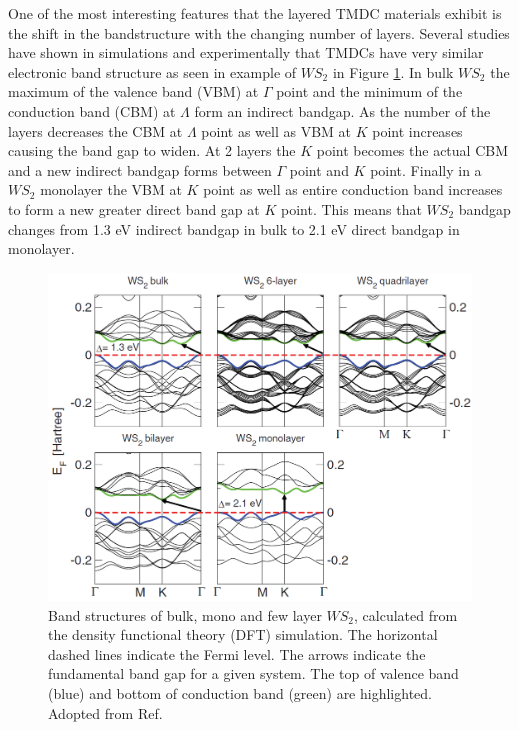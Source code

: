 One of the most interesting features that the layered TMDC materials exhibit is the shift in the bandstructure with the changing number of layers. Several studies have shown in simulations and experimentally that TMDCs have very similar electronic band structure as seen in example of $WS_2$ in Figure \ref{fig:WS2BandStructureSimulation}. In bulk $WS_2$ the maximum of the valence band (VBM) at $\Gamma$ point and the minimum of the conduction band (CBM) at $\Lambda$ form an indirect bandgap. As the number of the layers decreases the CBM at $\Lambda$ point as well as VBM at $K$ point increases causing the band gap to widen. At 2 layers the $K$ point becomes the actual CBM and a new indirect bandgap forms between $\Gamma$ point and $K$ point. Finally in a $WS_2$ monolayer the VBM at $K$ point as well as entire conduction band increases to form a new greater direct band gap at $K$ point. This means that $WS_2$ bandgap changes from 1.3 eV indirect bandgap in bulk to 2.1 eV direct bandgap in monolayer.
	
\begin{figure}[h]
	\begin{center}
		\includegraphics[scale=0.3]{WS2BandStructureSimulation.png}
		\caption{\small Band structures of bulk, mono and few layer $WS_2$, calculated from the density functional theory (DFT) simulation. The horizontal dashed lines indicate the Fermi level. The arrows indicate the fundamental band gap for a given system. The top of valence band (blue) and bottom of conduction band (green) are highlighted. Adopted from Ref. \cite{WS2BandStructureSimulation}}
		\label{fig:WS2BandStructureSimulation}
	\end{center}
\end{figure}
	
